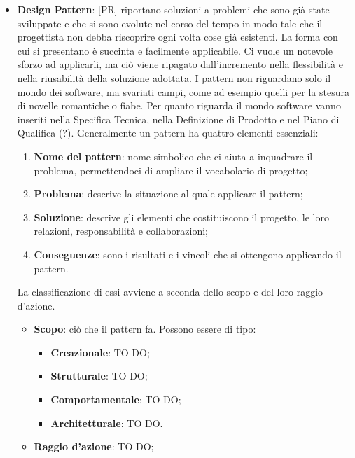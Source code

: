 \begin{itemize}
	\item \textbf{Design Pattern}: [PR] riportano soluzioni a problemi che sono già state sviluppate e che si sono evolute nel corso del tempo in modo tale che il progettista non debba riscoprire ogni volta cose già esistenti. La forma con cui si presentano è succinta e facilmente applicabile. Ci vuole un notevole sforzo ad applicarli, ma ciò viene ripagato dall'incremento nella flessibilità e nella riusabilità della soluzione adottata. \newline
	I pattern non riguardano solo il mondo dei software, ma svariati campi, come ad esempio quelli per la stesura di novelle romantiche o fiabe. \newline
	Per quanto riguarda il mondo software vanno inseriti nella Specifica Tecnica, nella Definizione di Prodotto e nel Piano di Qualifica (?). \newline
	Generalmente un pattern ha quattro elementi essenziali:
		\begin{enumerate}
			\item \textbf{Nome del pattern}: nome simbolico che ci aiuta a inquadrare il problema, permettendoci di ampliare il vocabolario di progetto;
			\item \textbf{Problema}: descrive la situazione al quale applicare il pattern;
			\item \textbf{Soluzione}: descrive gli elementi che costituiscono il progetto, le loro relazioni, responsabilità e collaborazioni;
			\item \textbf{Conseguenze}: sono i risultati e i vincoli che si ottengono applicando il pattern.
		\end{enumerate}
		\noindent
	La classificazione di essi avviene a seconda dello scopo e del loro raggio d'azione.
		\begin{itemize}
			\item \textbf{Scopo}: ciò che il pattern fa. Possono essere di tipo:
				\begin{itemize}
					\item \textbf{Creazionale}: TO DO;
					\item \textbf{Strutturale}: TO DO;
					\item \textbf{Comportamentale}: TO DO;
					\item \textbf{Architetturale}: TO DO.
				\end{itemize}
			\item \textbf{Raggio d'azione}: TO DO;
		\end{itemize}





\end{itemize}

